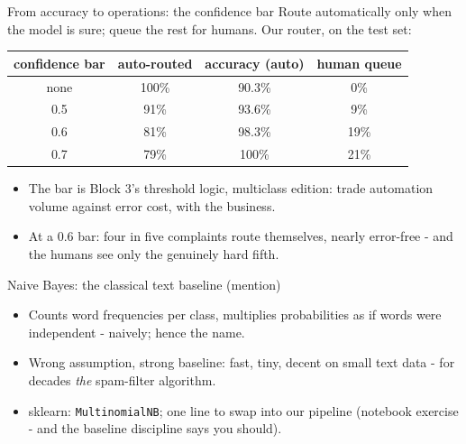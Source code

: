 \documentclass[10pt,aspectratio=169]{beamer}
\begin{document}
\begin{frame}{From accuracy to operations: the confidence bar}
  Route automatically only when the model is sure; queue the rest for
  humans. Our router, on the test set:
  \vspace{0.3em}
  \begin{center}\small
  \begin{tabular}{@{}cccc@{}}
    \toprule
    confidence bar & auto-routed & accuracy (auto) & human queue \\
    \midrule
    none & 100\% & 90.3\% & 0\% \\
    0.5 & 91\% & 93.6\% & 9\% \\
    \alert{0.6} & \alert{81\%} & \alert{98.3\%} & \alert{19\%} \\
    0.7 & 79\% & 100\% & 21\% \\
    \bottomrule
  \end{tabular}
  \end{center}
  \vspace{0.1em}
  \begin{itemize}\small
    \item The bar is Block 3's threshold logic, multiclass edition: trade
          automation volume against error cost, with the business.
    \item At a 0.6 bar: four in five complaints route themselves, nearly
          error-free - and the humans see only the genuinely hard fifth.
  \end{itemize}
\end{frame}

\begin{frame}{Naive Bayes: the classical text baseline (mention)}
  \begin{itemize}
    \item Counts word frequencies per class, multiplies probabilities as
          if words were independent - \alert{naively}; hence the name.
    \item Wrong assumption, strong baseline: fast, tiny, decent on small
          text data - for decades \emph{the} spam-filter algorithm.
    \item sklearn: \texttt{MultinomialNB}; one line to swap into our
          pipeline (notebook exercise - and the baseline discipline says
          you should).
  \end{itemize}
\end{frame}
\end{document}

